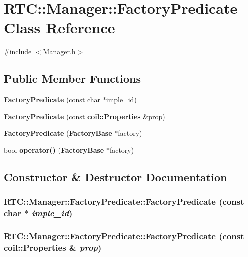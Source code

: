 \section{RTC::Manager::FactoryPredicate Class Reference}
\label{classRTC_1_1Manager_1_1FactoryPredicate}


{\ttfamily \#include $<$Manager.h$>$}

\subsection*{Public Member Functions}
\begin{DoxyCompactItemize}
\item 
{\bf FactoryPredicate} (const char $\ast$imple\_\-id)
\item 
{\bf FactoryPredicate} (const {\bf coil::Properties} \&prop)
\item 
{\bf FactoryPredicate} ({\bf FactoryBase} $\ast$factory)
\item 
bool {\bf operator()} ({\bf FactoryBase} $\ast$factory)
\end{DoxyCompactItemize}


\subsection{Constructor \& Destructor Documentation}
\subsubsection[{FactoryPredicate}]{\setlength{\rightskip}{0pt plus 5cm}RTC::Manager::FactoryPredicate::FactoryPredicate (const char $\ast$ {\em imple\_\-id})\hspace{0.3cm}{\ttfamily  [inline]}}\label{classRTC_1_1Manager_1_1FactoryPredicate_a1d0eea85745cc10f3fd32d80e6743264}
\subsubsection[{FactoryPredicate}]{\setlength{\rightskip}{0pt plus 5cm}RTC::Manager::FactoryPredicate::FactoryPredicate (const {\bf coil::Properties} \& {\em prop})\hspace{0.3cm}{\ttfamily  [inline]}}\label{classRTC_1_1Manager_1_1FactoryPredicate_aecd5e7c53b169caf67229ac3025bce4e}

